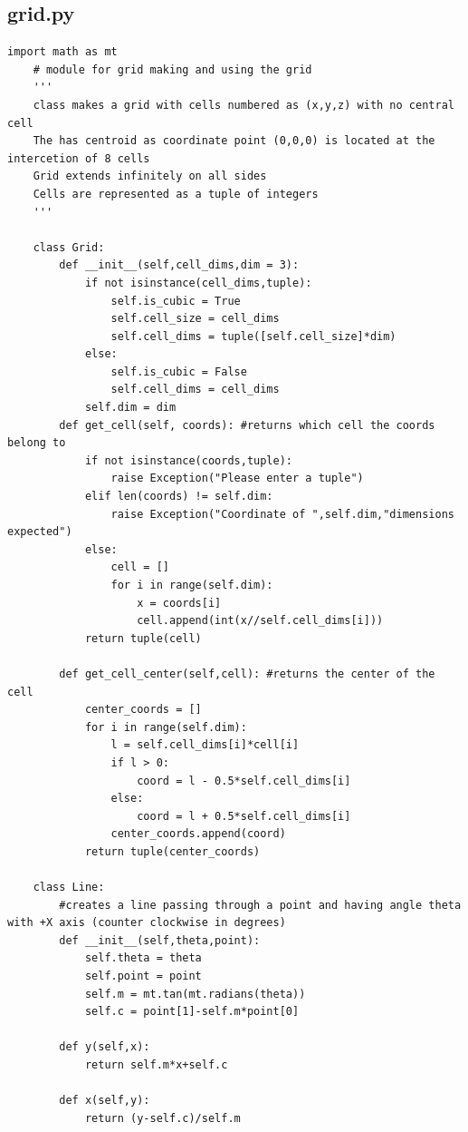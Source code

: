 \documentclass{article}
\begin{document}
\subsection{grid.py}
\begin{lstlisting}[style=python]
    import math as mt
    # module for grid making and using the grid
    ''' 
    class makes a grid with cells numbered as (x,y,z) with no central cell
    The has centroid as coordinate point (0,0,0) is located at the intercetion of 8 cells 
    Grid extends infinitely on all sides 
    Cells are represented as a tuple of integers
    '''
    
    class Grid:
        def __init__(self,cell_dims,dim = 3):
            if not isinstance(cell_dims,tuple):
                self.is_cubic = True
                self.cell_size = cell_dims
                self.cell_dims = tuple([self.cell_size]*dim)
            else:
                self.is_cubic = False
                self.cell_dims = cell_dims
            self.dim = dim
        def get_cell(self, coords): #returns which cell the coords belong to
            if not isinstance(coords,tuple):
                raise Exception("Please enter a tuple")
            elif len(coords) != self.dim:
                raise Exception("Coordinate of ",self.dim,"dimensions expected")
            else:
                cell = []
                for i in range(self.dim):
                    x = coords[i] 
                    cell.append(int(x//self.cell_dims[i]))
            return tuple(cell)
        
        def get_cell_center(self,cell): #returns the center of the cell
            center_coords = []
            for i in range(self.dim):
                l = self.cell_dims[i]*cell[i]
                if l > 0:
                    coord = l - 0.5*self.cell_dims[i]
                else:
                    coord = l + 0.5*self.cell_dims[i]
                center_coords.append(coord)
            return tuple(center_coords)
    
    class Line:
        #creates a line passing through a point and having angle theta with +X axis (counter clockwise in degrees)
        def __init__(self,theta,point):
            self.theta = theta
            self.point = point
            self.m = mt.tan(mt.radians(theta))
            self.c = point[1]-self.m*point[0]
        
        def y(self,x): 
            return self.m*x+self.c
        
        def x(self,y):
            return (y-self.c)/self.m
        

\end{lstlisting}
\end{document}
